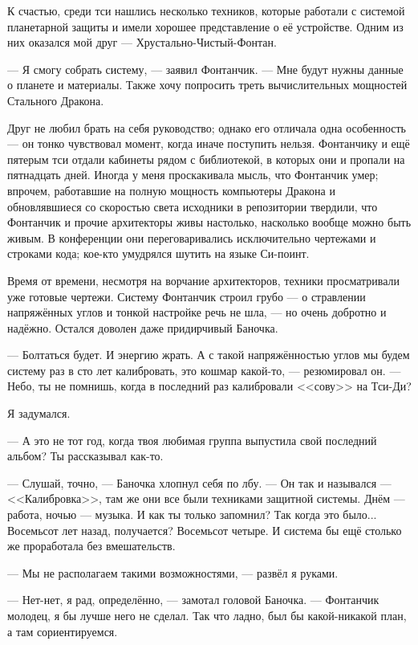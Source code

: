 К счастью, среди тси нашлись несколько техников, которые работали с системой планетарной защиты и имели хорошее представление о её устройстве.
Одним из них оказался мой друг --- Хрустально-Чистый-Фонтан.

--- Я смогу собрать систему, --- заявил Фонтанчик.
--- Мне будут нужны данные о планете и материалы.
Также хочу попросить треть вычислительных мощностей Стального Дракона.

Друг не любил брать на себя руководство;
однако его отличала одна особенность --- он тонко чувствовал момент, когда иначе поступить нельзя.
Фонтанчику и ещё пятерым тси отдали кабинеты рядом с библиотекой, в которых они и пропали на пятнадцать дней.
Иногда у меня проскакивала мысль, что Фонтанчик умер;
впрочем, работавшие на полную мощность компьютеры Дракона и обновлявшиеся со скоростью света исходники в репозитории твердили, что Фонтанчик и прочие архитекторы живы настолько, насколько вообще можно быть живым.
В конференции они переговаривались исключительно чертежами и строками кода;
кое-кто умудрялся шутить на языке Си-поинт.

Время от времени, несмотря на ворчание архитекторов, техники просматривали уже готовые чертежи.
Систему Фонтанчик строил грубо --- о стравлении напряжённых углов и тонкой настройке речь не шла, --- но очень добротно и надёжно.
Остался доволен даже придирчивый Баночка.

--- Болтаться будет.
И энергию жрать.
А с такой напряжённостью углов мы будем систему раз в сто лет калибровать, это кошмар какой-то, --- резюмировал он.
--- Небо, ты не помнишь, когда в последний раз калибровали <<сову>> на Тси-Ди?

Я задумался.

--- А это не тот год, когда твоя любимая группа выпустила свой последний альбом?
Ты рассказывал как-то.

--- Слушай, точно, --- Баночка хлопнул себя по лбу.
--- Он так и назывался --- <<Калибровка>>, там же они все были техниками защитной системы.
Днём --- работа, ночью --- музыка.
И как ты только запомнил?
Так когда это было...
Восемьсот лет назад, получается?
Восемьсот четыре.
И система бы ещё столько же проработала без вмешательств.

--- Мы не располагаем такими возможностями, --- развёл я руками.

--- Нет-нет, я рад, определённо, --- замотал головой Баночка.
--- Фонтанчик молодец, я бы лучше него не сделал.
Так что ладно, был бы какой-никакой план, а там сориентируемся.

